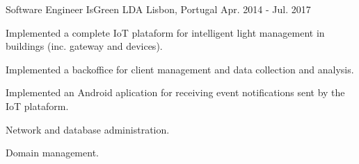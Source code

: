 


\begin{cventries}


\cventry
{Software Engineer } %
{IsGreen LDA} %
{Lisbon, Portugal} %
{Apr. 2014 - Jul. 2017} %
{ %
\begin{cvitems}
\item {Implemented a complete IoT plataform for intelligent light management in buildings (inc. gateway and devices).}
\item {Implemented a backoffice for client management and data collection and analysis.}
\item {Implemented an Android aplication for receiving event notifications sent by the IoT plataform.}
\item {Network and database administration.}
\item {Domain management.}
\end{cvitems}
}


\end{cventries}